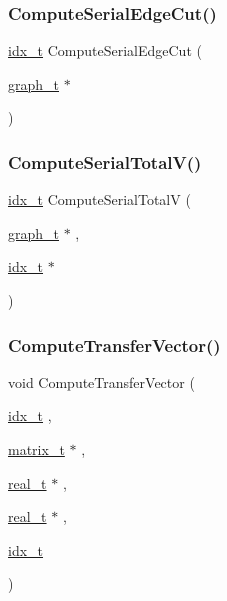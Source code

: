 \subsubsection{\texorpdfstring{Compute\+Serial\+Edge\+Cut()}{ComputeSerialEdgeCut()}}
{\footnotesize\ttfamily \hyperlink{a00876_aaa5262be3e700770163401acb0150f52}{idx\+\_\+t} Compute\+Serial\+Edge\+Cut (\begin{DoxyParamCaption}\item[{\hyperlink{a00734}{graph\+\_\+t} $\ast$}]{ }\end{DoxyParamCaption})}

\mbox{\label{a00951_a6137c6377253b0da4abdce68cf319bbb}} 
\subsubsection{\texorpdfstring{Compute\+Serial\+Total\+V()}{ComputeSerialTotalV()}}
{\footnotesize\ttfamily \hyperlink{a00876_aaa5262be3e700770163401acb0150f52}{idx\+\_\+t} Compute\+Serial\+TotalV (\begin{DoxyParamCaption}\item[{\hyperlink{a00734}{graph\+\_\+t} $\ast$}]{,  }\item[{\hyperlink{a00876_aaa5262be3e700770163401acb0150f52}{idx\+\_\+t} $\ast$}]{ }\end{DoxyParamCaption})}

\mbox{\label{a00951_ad9027393da83822c24b2ab8bc4cd9f39}} 
\subsubsection{\texorpdfstring{Compute\+Transfer\+Vector()}{ComputeTransferVector()}}
{\footnotesize\ttfamily void Compute\+Transfer\+Vector (\begin{DoxyParamCaption}\item[{\hyperlink{a00876_aaa5262be3e700770163401acb0150f52}{idx\+\_\+t}}]{,  }\item[{\hyperlink{a00754}{matrix\+\_\+t} $\ast$}]{,  }\item[{\hyperlink{a00876_a1924a4f6907cc3833213aba1f07fcbe9}{real\+\_\+t} $\ast$}]{,  }\item[{\hyperlink{a00876_a1924a4f6907cc3833213aba1f07fcbe9}{real\+\_\+t} $\ast$}]{,  }\item[{\hyperlink{a00876_aaa5262be3e700770163401acb0150f52}{idx\+\_\+t}}]{ }\end{DoxyParamCaption})}

